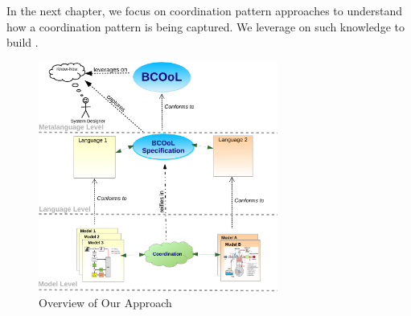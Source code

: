 In the next chapter, we focus on coordination pattern approaches to understand how a coordination pattern is being captured. We leverage on such knowledge to build \bcool. 

\begin{figure}
\begin{center}
\includegraphics[width=0.7\textwidth]{background/figs/bcoolapp}
\caption{Overview of Our Approach}
\label{fig:bcoolapp}
\end{center}
\end{figure}	


